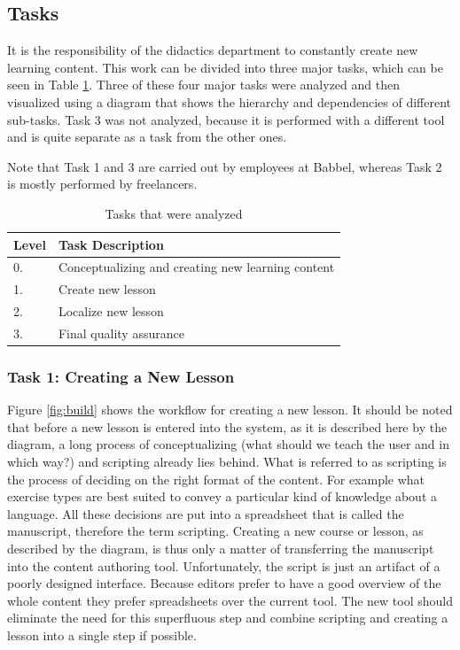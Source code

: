 \subsection{Tasks} \label{tasks}
It is the responsibility of the didactics department to constantly create new learning content. This work can be divided into three major tasks, which can be seen in Table \ref{table:analyzed-tasks}. Three of these four major tasks were analyzed and then visualized using a diagram that shows the hierarchy and dependencies of different sub-tasks. Task 3 was not analyzed, because it is performed with a different tool and is quite separate as a task from the other ones.

Note that Task 1 and 3 are carried out by employees at Babbel, whereas Task 2 is mostly performed by freelancers.


\begin{table}[h]
\centering
\begin{tabular}{|l|l|}
\hline
\rowcolor[HTML]{EFEFEF}
{\bf Level} & {\bf Task Description}      \\ \hline
0. & Conceptualizing and creating new learning content \\ \hline
1. & Create new lesson           \\
2. & Localize new lesson         \\
3. & Final quality assurance        \\ \hline
\end{tabular}
\caption{Tasks that were analyzed}
\label{table:analyzed-tasks}
\end{table}

\subsubsection{Task 1: Creating a New Lesson} \label{sec:task1}
Figure \ref{fig:build} shows the workflow for creating a new lesson. It should be noted that before a new lesson is entered into the system, as it is described here by the diagram, a long process of conceptualizing (what should we teach the user and in which way?) and scripting already lies behind. What is referred to as scripting is the process of deciding on the right format of the content. For example what exercise types are best suited to convey a particular kind of knowledge about a language. All these decisions are put into a spreadsheet that is called the manuscript, therefore the term scripting. Creating a new course or lesson, as described by the diagram, is thus only a matter of transferring the manuscript into the content authoring tool. Unfortunately, the script is just an artifact of a poorly designed interface. Because editors prefer to have a good overview of the whole content they prefer spreadsheets over the current tool. The new tool should eliminate the need for this superfluous step and combine scripting and creating a lesson into a single step if possible.

